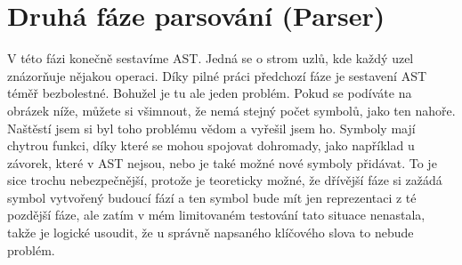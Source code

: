 \documentclass[12pt, a4paper, titlepage, abstract=on]{scrreprt}
\begin{document}
\section{Druhá fáze parsování (Parser)}
V této fázi konečně sestavíme AST. Jedná se o strom uzlů, kde každý uzel znázorňuje nějakou operaci. Díky pilné práci předchozí fáze je
sestavení AST téměř bezbolestné. Bohužel je tu ale jeden problém. Pokud se podíváte na obrázek níže, můžete si všimnout, že nemá stejný
počet symbolů, jako ten nahoře. Naštěstí jsem si byl toho problému vědom a vyřešil jsem ho. Symboly mají chytrou funkci, díky které se
mohou spojovat dohromady, jako například u závorek, které v AST nejsou, nebo je také možné nové symboly přidávat. To je sice trochu
nebezpečnější, protože je teoreticky možné, že dřívější fáze si zažádá symbol vytvořený budoucí fází a ten symbol bude mít jen reprezentaci
z té pozdější fáze, ale zatím v mém limitovaném testování tato situace nenastala, takže je logické usoudit, že u správně napsaného klíčového
slova to nebude problém.
\end{document}
